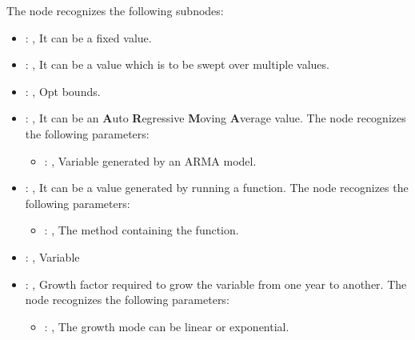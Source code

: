 \begin{itemize}
\begin{itemize}
          The  node recognizes the following subnodes:
          \begin{itemize}
            \item {}: , 
              It can be a fixed value.

            \item {}: , 
              It can be a value which is to be swept over multiple values.

            \item {}: , 
              Opt bounds.

            \item {}: , 
              It can be an \textbf{A}uto \textbf{R}egressive \textbf{M}oving \textbf{A}verage value.
              The  node recognizes the following parameters:
                \begin{itemize}
                  \item {}: , 
                    Variable generated by an ARMA model.
              \end{itemize}

            \item {}: , 
              It can be a value generated by running a function.
              The  node recognizes the following parameters:
                \begin{itemize}
                  \item {}: , 
                    The method containing the function.
              \end{itemize}

            \item {}: , 
              Variable

            \item {}: , 
              Growth factor required to grow the variable from one year to another.
              The  node recognizes the following parameters:
                \begin{itemize}
                  \item {}: , 
                    The growth mode can be linear or exponential.
              \end{itemize}
          \end{itemize}


\end{itemize}
\end{itemize}
